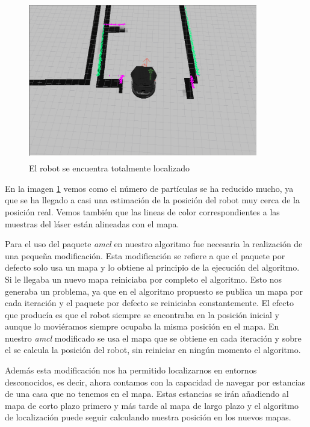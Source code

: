 \begin{figure}[hbtp]
  \begin{center}
    \includegraphics[width=10cm,height=7cm]{img/cap5/finamcl}
  \end{center}
  \caption{El robot se encuentra totalmente localizado}
  \label{fig:finamcl}
\end{figure}

En la imagen \ref{fig:finamcl} vemos como el número de partículas se ha reducido mucho, ya que se ha llegado a casi una estimación de la posición del robot muy cerca de la posición real. Vemos también que las lineas de color correspondientes a las muestras del láser están alineadas con el mapa.

Para el uso del paquete \textit{amcl} en nuestro algoritmo fue necesaria la realización de una pequeña modificación. Esta modificación se refiere a que el paquete por defecto solo usa un mapa y lo obtiene al principio de la ejecución del algoritmo. Si le llegaba un nuevo mapa reiniciaba por completo el algoritmo. Esto nos generaba un problema, ya que en el algoritmo propuesto se publica un mapa por cada iteración y el paquete por defecto se reiniciaba constantemente. El efecto que producía es que el robot siempre se encontraba en la posición inicial y aunque lo moviéramos siempre ocupaba la misma posición en el mapa. En nuestro \textit{amcl} modificado se usa el mapa que se obtiene en cada iteración y sobre el se calcula la posición del robot, sin reiniciar en ningún momento el algoritmo.

Además esta modificación nos ha permitido localizarnos en entornos desconocidos, es decir, ahora contamos con la capacidad de navegar por estancias de una casa que no tenemos en el mapa. Estas estancias se irán añadiendo al mapa de corto plazo primero y más tarde al mapa de largo plazo y el algoritmo de localización puede seguir calculando nuestra posición en los nuevos mapas.

